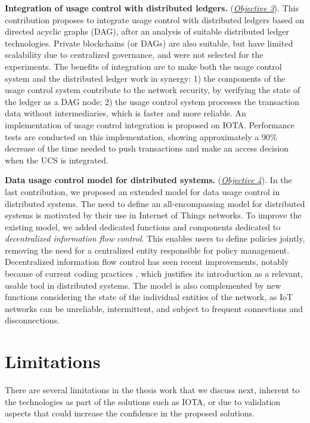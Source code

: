 \textbf{Integration of usage control with distributed ledgers.} (\hyperref[obj:23]{\emph{Objective 3}}).
This contribution proposes to integrate usage control with distributed ledgers based on directed acyclic graphs (DAG), after an analysis of suitable distributed ledger technologies. Private blockchains (or DAGs) are also suitable, 
but have limited scalability due to centralized governance, and were not selected for the experiments. The benefits of integration are to make both 
the usage control system and the distributed ledger work in synergy: 1) the components of the usage control system contribute
to the network security, by verifying the state of the ledger as a DAG node; 2) the usage control system processes the transaction data without intermediaries,
which is faster and more reliable. 
An implementation of usage control integration is proposed on IOTA. Performance tests are conducted on this implementation, showing approximately a 90\% decrease
of the time needed to push transactions and make an access decision when the UCS is integrated.

\textbf{Data usage control model for distributed systems.} (\hyperref[obj:4]{\emph{Objective 4}}). In the last contribution, we proposed an extended model for data usage 
control in distributed systems. The need to define an all-encompassing model for distributed systems is motivated by their use in Internet of Things networks. To improve the existing model, we added dedicated functions
and components dedicated to \emph{decentralized information flow control}. This enables users to define policies jointly, 
removing the need for a centralized entity responsible for policy management. Decentralized information flow control 
has seen recent improvements, notably because of current coding practices \cite{Liu2022}, which justifies its 
introduction as a relevant, usable tool in distributed systems. The model is also complemented by 
new functions considering the state of the individual entities of the network, as IoT networks 
can be unreliable, intermittent, and subject to frequent connections and disconnections.

\section{Limitations}
\label{S_limits}
There are several limitations in the thesis work that we discuss next, inherent to the technologies as part of the solutions such as IOTA, or due to validation aspects that could increase the confidence in the proposed solutions.

